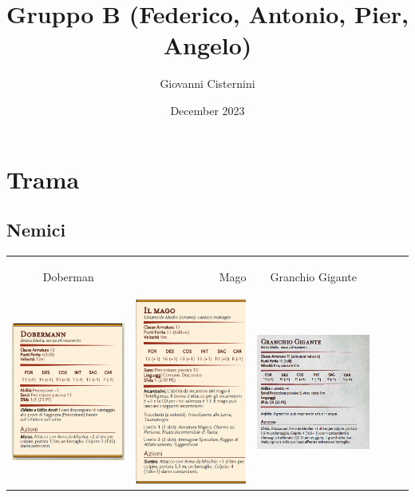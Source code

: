 \documentclass{article}
\title{Gruppo B (Federico, Antonio, Pier, Angelo)}
\author{Giovanni Cisternini}
\date{December 2023}
\begin{document}
\tableofcontents

\maketitle


\section{Trama}
\subsection{Nemici}
\begin{table}
    \centering
    \begin{tabular}{|cr cr cr|}
        \hypertarget{doberman}{Doberman} & Mago & \hypertarget{granchio}{Granchio Gigante} \\
        \includegraphics[width=4cm, height = 6 cm]{../Mostri/Doberman.png} &  \includegraphics[width=4cm, height = 6 cm]{../Mostri/mago.png} &\includegraphics[width=4cm, height = 6 cm]{../Mostri/Granchio Gigante.PNG}

\end{tabular}
\end{table}
\end{document}
